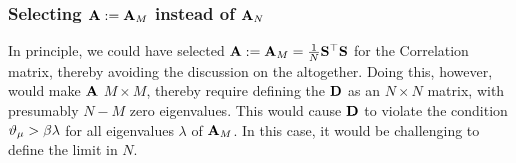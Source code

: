 \subsubsection{Selecting \texorpdfstring{$\mathbf{A}:=\mathbf{A}_M$}{A:=A M} instead of 
\texorpdfstring{$\mathbf{A}_N$}{A N}}
\label{sxn:tanaka_end}
In principle, we could have selected $\mathbf{A}:=\mathbf{A}_M=\tfrac{1}{N}{\mathbf{S}}^{\top}{\mathbf{S}}$  for the \Student Correlation matrix,
thereby avoiding the discussion on the \DualityOfMeasures altogether.
Doing this, however, would make $\mathbf{A}$ $M\times M$, thereby
require defining the \SourceMatrix $\mathbf{D}$ as an
$N \times N$ matrix, with presumably $N-M$ zero eigenvalues.
This would cause $\mathbf{D}$ to violate the condition $\vartheta_{\mu} > \beta\lambda$
for all eigenvalues $\lambda$ of $\mathbf{A}_M$.
In this case, it would be challenging to define the \LargeN limit in $N$.
